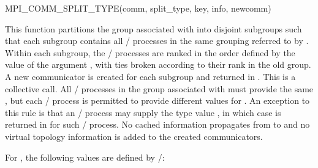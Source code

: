 %
\begin{funcdef}{MPI\_COMM\_SPLIT\_TYPE}{(\mbox{comm}, \mbox{split\_type}, \mbox{key}, \mbox{info}, \mbox{newcomm})}
\end{funcdef}

\noindent This function partitions the group associated with
 into disjoint subgroups such that each subgroup contains
all \MPI/ processes in the same grouping referred to by .
Within each subgroup, the \MPI/ processes are ranked in the order
defined by the value of the argument , with ties broken
according to their rank in the old group. A new communicator is
created for each subgroup and returned in . This is a
collective call. All \MPI/ processes in the group associated with
 must provide the same , but each
\MPI/ process is permitted to provide different values for .
An exception to this rule is that an \MPI/ process may supply the type
value , in which case  is
returned in  for such \MPI/ process.
No cached information propagates from  to  and no
virtual topology information is added to the created communicators.


For , the following values are defined by \MPI/:

